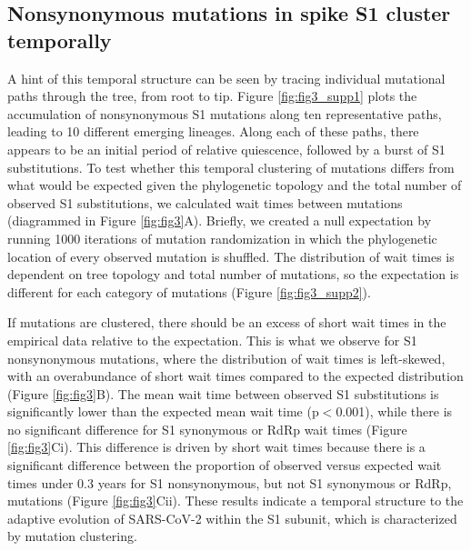 \documentclass[12pt, letterpaper]{article}
\begin{document}
\subsection*{Nonsynonymous mutations in spike S1 cluster temporally}
A hint of this temporal structure can be seen by tracing individual mutational paths through the tree, from root to tip. Figure \ref{fig:fig3_supp1} plots the accumulation of nonsynonymous S1 mutations along ten representative paths, leading to 10 different emerging lineages. Along each of these paths, there appears to be an initial period of relative quiescence, followed by a burst of S1 substitutions. To test whether this temporal clustering of mutations differs from what would be expected given the phylogenetic topology and the total number of observed S1 substitutions, we calculated wait times between mutations (diagrammed in Figure \ref{fig:fig3}A). Briefly, we created a null expectation by running 1000 iterations of mutation randomization in which the phylogenetic location of every observed mutation is shuffled. The distribution of wait times is dependent on tree topology and total number of mutations, so the expectation is different for each category of mutations (Figure \ref{fig:fig3_supp2}).

If mutations are clustered, there should be an excess of short wait times in the empirical data relative to the expectation. This is what we observe for S1 nonsynonymous mutations, where the distribution of wait times is left-skewed, with an overabundance of short wait times compared to the expected distribution (Figure \ref{fig:fig3}B). The mean wait time between observed S1 substitutions is significantly lower than the expected mean wait time (p$<$0.001), while there is no significant difference for S1 synonymous or RdRp wait times (Figure \ref{fig:fig3}Ci). This difference is driven by short wait times because there is a significant difference between the proportion of observed versus expected wait times under 0.3 years for S1 nonsynonymous, but not S1 synonymous or RdRp, mutations (Figure \ref{fig:fig3}Cii). These results indicate a temporal structure to the adaptive evolution of SARS-CoV-2 within the S1 subunit, which is characterized by mutation clustering.
\end{document}
